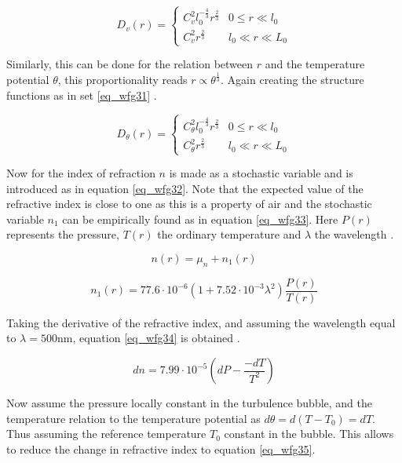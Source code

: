 \documentclass{article}
\begin{document}
\begin{equation}
D_v(r) = 
\begin{cases}
C_v^2 l_0^{-\frac{4}{3}} r^{\frac{2}{3}} & 0 \leq r \ll l_0\\
C_v^2 r^{\frac{2}{3}} & l_0 \ll r \ll L_0 
\end{cases}
\label{eq_wfg30}
\end{equation}

Similarly, this can be done for the relation between $r$ and the temperature potential $\theta$, this proportionality reads $r \propto \theta^{\frac{1}{3}}$. Again creating the structure functions as in set \ref{eq_wfg31} \cite{zernikeMatlab}.

\begin{equation}
D_\theta(r) = 
\begin{cases}
C_\theta^2 l_0^{-\frac{4}{3}} r^{\frac{2}{3}} & 0 \leq r \ll l_0\\
C_\theta^2 r^{\frac{2}{3}} & l_0 \ll r \ll L_0 
\end{cases}
\label{eq_wfg31}
\end{equation}

Now for the index of refraction $n$ is made as a stochastic variable and is introduced as in equation \ref{eq_wfg32}. Note that the expected value of the refractive index is close to one as this is a property of air and the stochastic variable $n_1$ can be empirically found as in equation \ref{eq_wfg33}. Here $P(r)$ represents the pressure, $T(r)$ the ordinary temperature and $\lambda$ the wavelength \cite{zernikeMatlab}.

\begin{equation}
n(r) = \mu_n + n_1(r)
\label{eq_wfg32}
\end{equation}

\begin{equation}
n_1(r) = 77.6 \cdot 10^{-6} (1 + 7.52 \cdot 10^{-3} \lambda^2) \frac{P(r)}{T(r)}
\label{eq_wfg33}
\end{equation}

Taking the derivative of the refractive index, and assuming the wavelength equal to $\lambda  = 500 \text{nm}$, equation \ref{eq_wfg34} is obtained \cite{zernikeMatlab}.

\begin{equation}
dn = 7.99 \cdot 10^{-5} \left( dP - \frac{-dT}{T^2} \right)
\label{eq_wfg34}
\end{equation}

Now assume the pressure locally constant in the turbulence bubble, and the temperature relation to the temperature potential as $d\theta = d(T - T_0) = dT$. Thus assuming the reference temperature $T_0$ constant in the bubble.  This allows to reduce the change in refractive index to equation \ref{eq_wfg35}.
\end{document}
